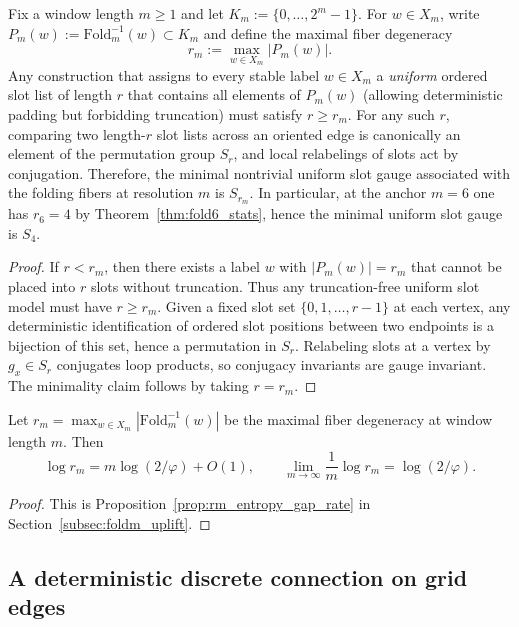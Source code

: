\begin{proposition}\label{prop:max_fiber_deg_forces_perm_gauge}
\MathTag Fix a window length $m\ge 1$ and let $K_m:=\{0,\dots,2^m-1\}$.
For $w\in X_m$, write $P_m(w):=\mathrm{Fold}_m^{-1}(w)\subset K_m$ and define the maximal fiber degeneracy
\[
r_m:=\max_{w\in X_m}|P_m(w)|.
\]
Any construction that assigns to every stable label $w\in X_m$ a \emph{uniform} ordered slot list of length $r$ that contains all elements of $P_m(w)$ (allowing deterministic padding but forbidding truncation) must satisfy $r\ge r_m$.
For any such $r$, comparing two length-$r$ slot lists across an oriented edge is canonically an element of the permutation group $S_r$, and local relabelings of slots act by conjugation.
Therefore, the minimal nontrivial uniform slot gauge associated with the folding fibers at resolution $m$ is $S_{r_m}$.
In particular, at the anchor $m=6$ one has $r_6=4$ by Theorem~\ref{thm:fold6_stats}, hence the minimal uniform slot gauge is $S_4$.
\end{proposition}
\begin{proof}
If $r<r_m$, then there exists a label $w$ with $|P_m(w)|=r_m$ that cannot be placed into $r$ slots without truncation.
Thus any truncation-free uniform slot model must have $r\ge r_m$.
Given a fixed slot set $\{0,1,\dots,r-1\}$ at each vertex, any deterministic identification of ordered slot positions between two endpoints is a bijection of this set, hence a permutation in $S_r$.
Relabeling slots at a vertex by $g_x\in S_r$ conjugates loop products, so conjugacy invariants are gauge invariant.
The minimality claim follows by taking $r=r_m$.
\end{proof}

\begin{corollary}\label{cor:rm_growth_rate}
\MathTag Let $r_m=\max_{w\in X_m}|\mathrm{Fold}_m^{-1}(w)|$ be the maximal fiber degeneracy at window length $m$.
Then
\[
\log r_m = m\log(2/\varphi)+O(1),
\qquad
\lim_{m\to\infty}\frac{1}{m}\log r_m=\log(2/\varphi).
\]
\end{corollary}
\begin{proof}
This is Proposition~\ref{prop:rm_entropy_gap_rate} in Section~\ref{subsec:foldm_uplift}.
\end{proof}

\subsection{A deterministic discrete connection on grid edges}
\label{subsec:deterministic_edge_connection}

